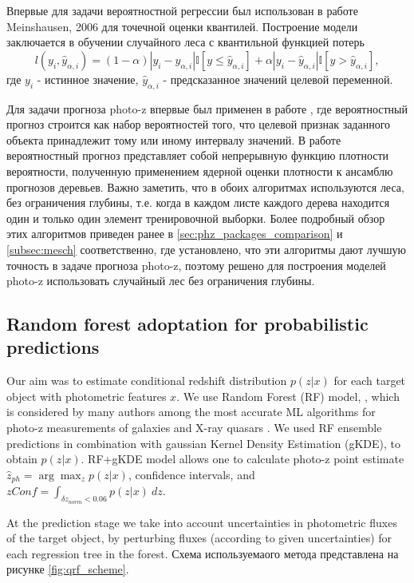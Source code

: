 \documentclass[fleqn,usenatbib]{mnras}
\begin{document}
Впервые для задачи вероятностной регрессии был использован в работе Meinshausen, 2006 \cite{bib:forests_meinshausen} для точечной оценки квантилей. Построение модели заключается в обучении случайного леса с квантильной функцией потерь 
\begin{equation}
    l(y_i, \hat{y}_{\alpha, i}) = (1-\alpha)|y_i - \hat{y}_{\alpha, i}|\mathbb{I}[y \leq \hat{y}_{\alpha, i}] + \alpha|y_i - \hat{y}_{\alpha, i}|\mathbb{I}[y > \hat{y}_{\alpha, i}],
\end{equation}
где \(y_i\) - истинное значение, \(\hat{y}_{\alpha, i}\) - предсказанное значений целевой переменной.

Для задачи прогноза photo-z впервые был применен в работе \cite{bib:tpz}, где вероятностный прогноз строится как набор вероятностей того, что целевой признак заданного объекта принадлежит тому или иному интервалу значений. В работе \cite{bib:mesch} вероятностный прогноз представляет собой непрерывную функцию плотности вероятности, полученную применением ядерной оценки плотности к ансамблю прогнозов деревьев. Важно заметить, что в обоих алгоритмах используются леса, без ограничения глубины, т.е. когда в каждом листе каждого дерева находится один и только один элемент тренировочной выборки. Более подробный обзор этих алгоритмов приведен ранее в \ref{sec:phz_packages_comparison} и \ref{subsec:mesch} соответственно, где установлено, что эти алгоритмы дают лучшую точность в задаче прогноза photo-z, поэтому решено для построения моделей photo-z использовать случайный лес без ограничения глубины.

\subsection{Random forest adoptation for probabilistic predictions}
Our aim was to estimate conditional redshift distribution $p(z|x)$ for each target object with photometric features $x$.
We use Random Forest (RF) model, \citep{2001MachL..45....5B,JMLR:v7:meinshausen06a}, which is considered by many authors among the most accurate ML algorithms for photo-z measurements of galaxies \citep{2020MNRAS.499.1587S,2020arXiv200912112E} and X-ray quasars \citep{2018AstL...44..735M}. We used RF ensemble predictions in combination with gaussian Kernel Density Estimation (gKDE), to obtain $p(z|x)$. RF+gKDE model allows one to calculate photo-z point estimate $\hat{z}_{ph} = \arg\max_z p(z|x)$, confidence intervals, and $zConf = \int_{\delta z_{norm} < 0.06} p(z|x)~dz$.

At the prediction stage we take into account uncertainties in photometric fluxes of the target object, by perturbing  fluxes (according to given uncertainties) for each regression tree in the forest. Схема используемаого метода представлена на рисунке \ref{fig:qrf_scheme}.
\end{document}

